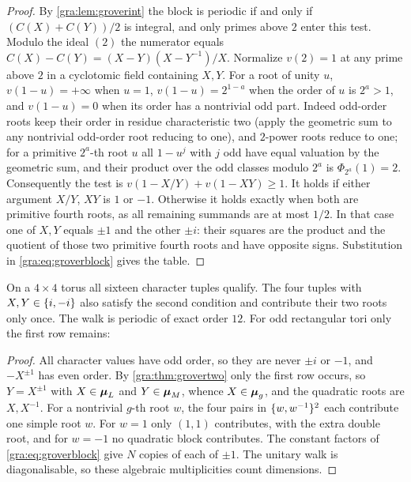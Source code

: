 \begin{proof}
By \cref{gra:lem:groverint} the block is periodic if and only if $(C(X)+C(Y))/2$ is
integral, and only primes above $2$ enter this test. Modulo the ideal $(2)$ the numerator
equals $C(X)-C(Y)=(X-Y)(X-Y^{-1})/X$. Normalize $v(2)=1$ at any prime above $2$ in a
cyclotomic field containing $X,Y$. For a root of unity $u$, $v(1-u)=+\infty$ when $u=1$,
$v(1-u)=2^{1-a}$ when the order of $u$ is $2^a>1$, and $v(1-u)=0$ when its order has a
nontrivial odd part. Indeed odd-order roots keep their order in residue characteristic two
(apply the geometric sum to any nontrivial odd-order root reducing to one), and $2$-power
roots reduce to one; for a primitive $2^a$-th root $u$ all $1-u^j$ with $j$ odd have equal
valuation by the geometric sum, and their product over the odd classes modulo $2^a$ is
$\Phi_{2^a}(1)=2$. Consequently the test is $v(1-X/Y)+v(1-XY)\ge1$. It holds if either
argument $X/Y$, $XY$ is $1$ or $-1$. Otherwise it holds exactly when both are primitive
fourth roots, as all remaining summands are at most $1/2$. In that case one of $X,Y$ equals
$\pm1$ and the other $\pm i$: their squares are the product and the quotient of those two
primitive fourth roots and have opposite signs. Substitution in \eqref{gra:eq:groverblock}
gives the table.
\end{proof}

On a $4\times4$ torus all sixteen character tuples qualify. The four tuples with
$X,Y\in\{i,-i\}$ also satisfy the second condition and contribute their two roots only
once. The walk is periodic of exact order $12$. For odd rectangular tori only the first
row remains:


\begin{proof}
All character values have odd order, so they are never $\pm i$ or $-1$, and $-X^{\pm1}$
has even order. By \cref{gra:thm:grovertwo} only the first row occurs, so $Y=X^{\pm1}$
with $X\in\boldsymbol{\mu}_L$ and $Y\in\boldsymbol{\mu}_M$, whence $X\in\boldsymbol{\mu}_g$, and the quadratic roots are
$X,X^{-1}$. For a nontrivial $g$-th root $w$, the four pairs in $\{w,w^{-1}\}^2$ each
contribute one simple root $w$. For $w=1$ only $(1,1)$ contributes, with the extra double
root, and for $w=-1$ no quadratic block contributes. The constant factors of
\eqref{gra:eq:groverblock} give $N$ copies of each of $\pm1$. The unitary walk is
diagonalisable, so these algebraic multiplicities count dimensions.
\end{proof}


